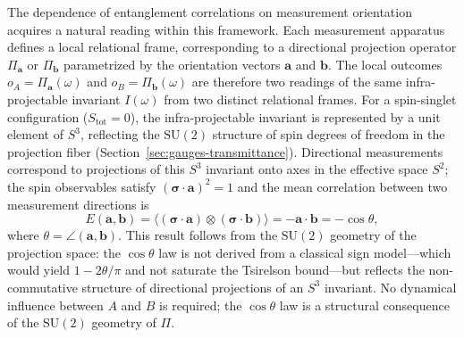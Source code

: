   The dependence of entanglement correlations on measurement orientation acquires a
  natural reading within this framework.
  Each measurement apparatus defines a local relational frame, corresponding to a
  directional projection operator $\Pi_{\mathbf{a}}$ or $\Pi_{\mathbf{b}}$ parametrized
  by the orientation vectors $\mathbf{a}$ and $\mathbf{b}$.
  The local outcomes $o_A = \Pi_{\mathbf{a}}(\omega)$ and $o_B = \Pi_{\mathbf{b}}(\omega)$
  are therefore two readings of the same infra-projectable invariant $I(\omega)$ from
  two distinct relational frames.
  For a spin-singlet configuration ($S_\mathrm{tot} = 0$), the infra-projectable invariant
  is represented by a unit element of $S^3$, reflecting the $\mathrm{SU}(2)$ structure of
  spin degrees of freedom in the projection fiber (Section~\ref{sec:gauges-transmittance}).
  Directional measurements correspond to projections of this $S^3$ invariant onto axes
  in the effective space $S^2$; the spin observables satisfy $(\boldsymbol{\sigma}\cdot\mathbf{a})^2 = 1$
  and the mean correlation between two measurement directions is
  \begin{equation}
    E(\mathbf{a}, \mathbf{b})
    = \langle (\boldsymbol{\sigma}\cdot\mathbf{a}) \otimes (\boldsymbol{\sigma}\cdot\mathbf{b}) \rangle
    = -\mathbf{a} \cdot \mathbf{b} = -\cos\theta,
    \label{eq:Bell-cosine}
  \end{equation}
  where $\theta = \angle(\mathbf{a},\mathbf{b})$.
  This result follows from the $\mathrm{SU}(2)$ geometry of the projection space: the
  $\cos\theta$ law is not derived from a classical sign model---which would yield
  $1 - 2\theta/\pi$ and not saturate the Tsirelson bound---but reflects the
  non-commutative structure of directional projections of an $S^3$ invariant.
  No dynamical influence between $A$ and $B$ is required; the $\cos\theta$ law
  is a structural consequence of the $\mathrm{SU}(2)$ geometry of $\Pi$.

